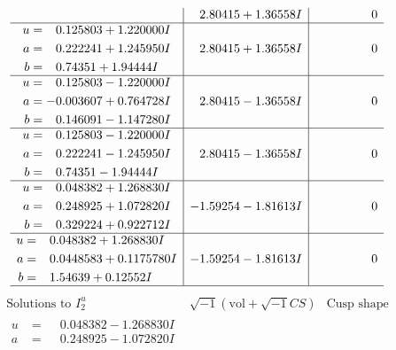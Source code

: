 \documentclass[1p]{elsarticle_modified}
\theoremstyle{definition}
\newcommand{\I}{\sqrt{-1}}
\begin{document}
$$\begin{array}{c|c|c}
 & \phantom{-}2.80415 + 1.36558 I & \phantom{-0.000000 } 0 \\ \hline\begin{aligned}
u &= \phantom{-}0.125803 + 1.220000 I \\
a &= \phantom{-}0.222241 + 1.245950 I \\
b &= \phantom{-}0.74351 + 1.94444 I\end{aligned}
 & \phantom{-}2.80415 + 1.36558 I & \phantom{-0.000000 } 0 \\ \hline\begin{aligned}
u &= \phantom{-}0.125803 - 1.220000 I \\
a &= -0.003607 + 0.764728 I \\
b &= \phantom{-}0.146091 - 1.147280 I\end{aligned}
 & \phantom{-}2.80415 - 1.36558 I & \phantom{-0.000000 } 0 \\ \hline\begin{aligned}
u &= \phantom{-}0.125803 - 1.220000 I \\
a &= \phantom{-}0.222241 - 1.245950 I \\
b &= \phantom{-}0.74351 - 1.94444 I\end{aligned}
 & \phantom{-}2.80415 - 1.36558 I & \phantom{-0.000000 } 0 \\ \hline\begin{aligned}
u &= \phantom{-}0.048382 + 1.268830 I \\
a &= \phantom{-}0.248925 + 1.072820 I \\
b &= \phantom{-}0.329224 + 0.922712 I\end{aligned}
 & -1.59254 - 1.81613 I & \phantom{-0.000000 } 0 \\ \hline\begin{aligned}
u &= \phantom{-}0.048382 + 1.268830 I \\
a &= \phantom{-}0.0448583 + 0.1175780 I \\
b &= \phantom{-}1.54639 + 0.12552 I\end{aligned}
 & -1.59254 - 1.81613 I & \phantom{-0.000000 } 0\\
 \hline 
 \end{array}$$\newpage$$\begin{array}{c|c|c}  
\text{Solutions to }I^u_{2}& \I (\text{vol} + \sqrt{-1}CS) & \text{Cusp shape}\\
 \hline 
\begin{aligned}
u &= \phantom{-}0.048382 - 1.268830 I \\
a &= \phantom{-}0.248925 - 1.072820 I \\

\end{aligned}
\end{array}$$
\end{document}
